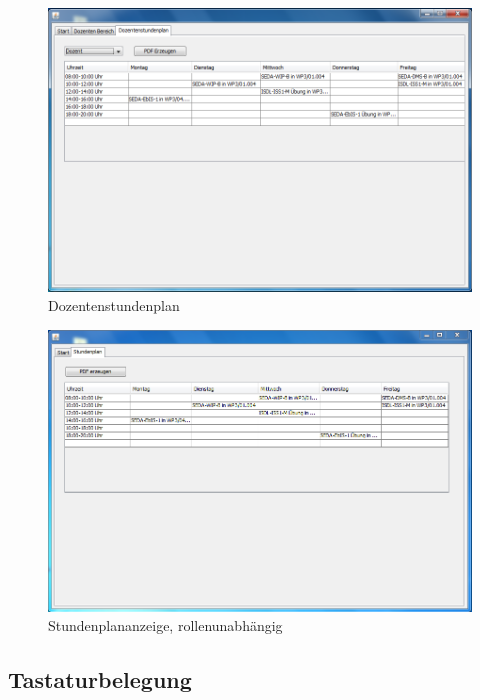 \begin{figure}[H]
\begin{center}
\includegraphics[width=150mm]{images/section_7/DozentenStundenplan.PNG}
\caption{Dozentenstundenplan}
\label{img:StundenplanDoz}
\end{center}
\end{figure}

\begin{figure}[H]
\begin{center}
\includegraphics[width=150mm]{images/section_7/HauptseiteAlleStundenplan.PNG}
\caption{Stundenplananzeige, rollenunabhängig}
\label{img:stundenplanAlle}
\end{center}
\end{figure}
 
\subsection{Tastaturbelegung}

